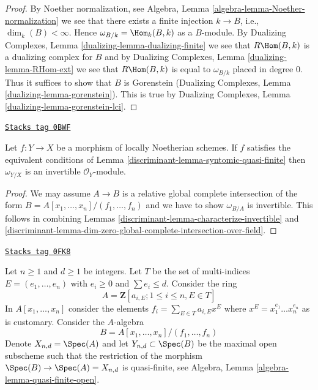 \begin{proof}
By Noether normalization, see
Algebra, Lemma \ref{algebra-lemma-Noether-normalization}
we see that there exists a finite injection $k \to B$, i.e.,
$\dim_k(B) < \infty$. Hence $\omega_{B/k} = \Hom_k(B, k)$
as a $B$-module.
By Dualizing Complexes, Lemma \ref{dualizing-lemma-dualizing-finite}
we see that $R\Hom(B, k)$ is a dualizing complex for $B$
and by Dualizing Complexes, Lemma \ref{dualizing-lemma-RHom-ext}
we see that $R\Hom(B, k)$ is equal to $\omega_{B/k}$
placed in degree $0$. Thus it suffices to show that
$B$ is Gorenstein
(Dualizing Complexes, Lemma \ref{dualizing-lemma-gorenstein}).
This is true by Dualizing Complexes, Lemma
\ref{dualizing-lemma-gorenstein-lci}.
\end{proof}

\begin{lemma}
\label{discriminant-lemma-dualizing-syntomic-quasi-finite}
\href{https://stacks.math.columbia.edu/tag/0BWF}{\texttt{Stacks tag 0BWF}}

Let $f : Y \to X$ be a morphism of locally Noetherian schemes. If $f$
satisfies the equivalent conditions of Lemma \ref{discriminant-lemma-syntomic-quasi-finite}
then $\omega_{Y/X}$ is an invertible $\mathcal{O}_Y$-module.
\end{lemma}

\begin{proof}

We may assume $A \to B$ is a relative global complete
intersection of the form $B = A[x_1, \ldots, x_n]/(f_1, \ldots, f_n)$
and we have to show $\omega_{B/A}$ is invertible.
This follows in combining Lemmas \ref{discriminant-lemma-characterize-invertible} and
\ref{discriminant-lemma-dim-zero-global-complete-intersection-over-field}.
\end{proof}

\begin{example}
\label{discriminant-example-universal-quasi-finite-syntomic}
\href{https://stacks.math.columbia.edu/tag/0FK8}{\texttt{Stacks tag 0FK8}}

Let $n \geq 1$ and $d \geq 1$ be integers. Let $T$ be the set of
multi-indices $E = (e_1, \ldots, e_n)$ with $e_i \geq 0$ and
$\sum e_i \leq d$. Consider the ring
$$
A = \mathbf{Z}[a_{i, E} ; 1 \leq i \leq n, E \in T]
$$
In $A[x_1, \ldots, x_n]$ consider the elements
$f_i = \sum_{E \in T} a_{i, E} x^E$ where $x^E = x_1^{e_1} \ldots x_n^{e_n}$
as is customary. Consider the $A$-algebra
$$
B = A[x_1, \ldots, x_n]/(f_1, \ldots, f_n)
$$
Denote $X_{n, d} = \Spec(A)$ and let $Y_{n, d} \subset \Spec(B)$
be the maximal open subscheme such that the restriction of the
morphism $\Spec(B) \to \Spec(A) = X_{n, d}$ is quasi-finite, see
Algebra, Lemma \ref{algebra-lemma-quasi-finite-open}.
\end{example}

